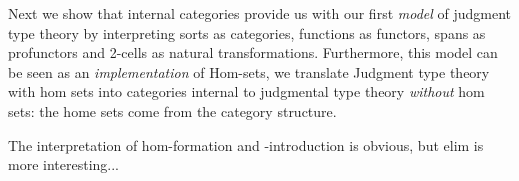 \documentclass{article}
\begin{document}
Next we show that internal categories provide us with our first
\emph{model} of judgment type theory by interpreting sorts as
categories, functions as functors, spans as profunctors and 2-cells as
natural transformations.
%
Furthermore, this model can be seen as an \emph{implementation} of
Hom-sets, we translate Judgment type theory with hom sets into
categories internal to judgmental type theory \emph{without} hom sets:
the home sets come from the category structure.

The interpretation of hom-formation and -introduction is obvious, but
elim is more interesting...
\end{document}
